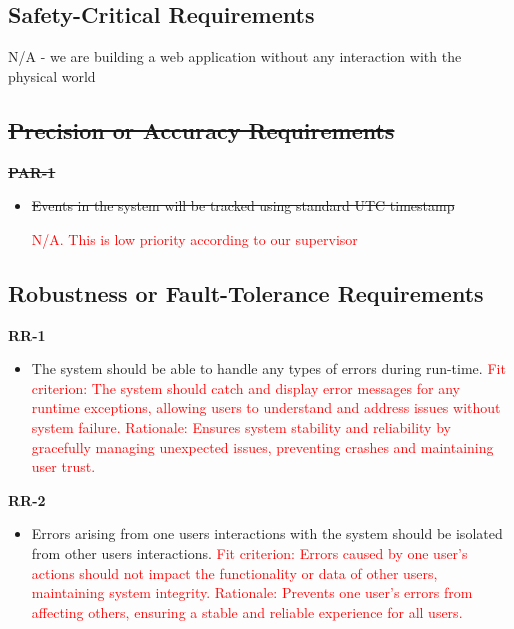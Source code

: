 \documentclass[12pt]{article}
\begin{document}
\subsection{Safety-Critical Requirements}
N/A - we are building a web application without any interaction with the physical world
\subsection{\sout{Precision or Accuracy Requirements}}
\textbf{\sout{PAR-1}}
\begin{itemize}
    \item \sout{Events in the system will be tracked using standard UTC timestamp}

    \textcolor{red}{N/A. This is low priority according to our supervisor}
\end{itemize}
\subsection{Robustness or Fault-Tolerance Requirements}
\textbf{RR-1}
\begin{itemize}
    \item The system should be able to handle any types of errors during run-time.\hfill \break
    \textcolor{red} {Fit criterion: The system should catch and display error messages for any runtime exceptions, allowing users to understand and address issues without system failure.}
    \hfill \break
    \textcolor{red} {Rationale: Ensures system stability and reliability by gracefully managing unexpected issues, preventing crashes and maintaining user trust.}
\end{itemize}
\textbf{RR-2}
\begin{itemize}
    \item Errors arising from one users interactions with the system should be isolated from other users interactions.\hfill \break
    \textcolor{red} {Fit criterion: Errors caused by one user's actions should not impact the functionality or data of other users, maintaining system integrity.}
    \hfill \break
    \textcolor{red} {Rationale: Prevents one user's errors from affecting others, ensuring a stable and reliable experience for all users.}
\end{itemize}
\end{document}
